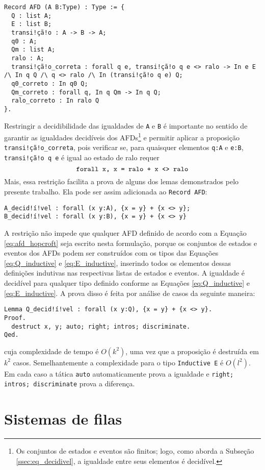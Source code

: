 \begin{verbatim}
Record AFD (A B:Type) : Type := {
  Q : list A;
  E : list B;
  transi!çã!o : A -> B -> A;
  q0 : A;
  Qm : list A;
  ralo : A;
  transi!çã!o_correta : forall q e, transi!çã!o q e <> ralo -> In e E /\ In q Q /\ q <> ralo /\ In (transi!çã!o q e) Q;
  q0_correto : In q0 Q;
  Qm_correto : forall q, In q Qm -> In q Q;
  ralo_correto : In ralo Q
}.
\end{verbatim}

Restringir a decidibilidade das igualdades de \texttt{A} e \texttt{B} é importante no sentido de garantir as igualdades decidíveis dos AFDs\footnote{Os conjuntos de estados e eventos são finitos; logo, como aborda a Subseção \ref{ssec:eq_decidivel}, a igualdade entre seus elementos é decidível.} e permitir aplicar a proposição \texttt{transi!çã!o_correta}, pois verificar se, para quaisquer elementos \texttt{q:A} e \texttt{e:B}, \texttt{transi!çã!o q e} é igual ao estado de ralo requer $$\text{\texttt{forall x, {x = ralo} + {x <> ralo}}}$$ Mais, essa restrição facilita a prova de alguns dos lemas demonstrados pelo presente trabalho. Ela pode ser assim adicionada ao \texttt{Record AFD}:

\begin{verbatim}
A_decid!í!vel : forall (x y:A), {x = y} + {x <> y};
B_decid!í!vel : forall (x y:B), {x = y} + {x <> y}
\end{verbatim}

A restrição não impede que qualquer AFD definido de acordo com a Equação \ref{eq:afd_hopcroft} seja escrito nesta formulação, porque os conjuntos de estados e eventos dos AFDs podem ser construídos com os tipos das Equações \ref{eq:Q_inductive} e \ref{eq:E_inductive}, inserindo todos os elementos dessas definições indutivas nas respectivas listas de estados e eventos. A igualdade é decidível para qualquer tipo definido conforme as Equações \ref{eq:Q_inductive} e \ref{eq:E_inductive}. A prova disso é feita por análise de casos da seguinte maneira:

\begin{verbatim}
Lemma Q_decid!í!vel : forall (x y:Q), {x = y} + {x <> y}.
Proof.
  destruct x, y; auto; right; intros; discriminate.
Qed.
\end{verbatim}

\noindent
cuja complexidade de tempo é $O(k^2)$, uma vez que a proposição é destruída em $k^2$ casos. Semelhantemente a complexidade para o tipo \texttt{Inductive E} é $O(l^2)$. Em cada caso a tática \texttt{auto} automaticamente prova a igualdade e \texttt{right; intros; discriminate} prova a diferença.

\section{Sistemas de filas}
